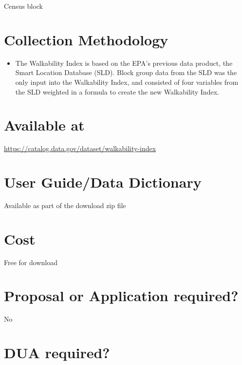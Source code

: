 \documentclass[
]{book}
\providecommand{\tightlist}{%
  \setlength{\itemsep}{0pt}\setlength{\parskip}{0pt}}
\begin{document}
Census block

\hypertarget{collection-methodology-97}{%
\section{Collection Methodology}\label{collection-methodology-97}}

\begin{itemize}
\tightlist
\item
  The Walkability Index is based on the EPA's previous data product, the Smart Location Database (SLD). Block group data from the SLD was the only input into the Walkability Index, and consisted of four variables from the SLD weighted in a formula to create the new Walkability Index.
\end{itemize}

\hypertarget{available-at-97}{%
\section{Available at}\label{available-at-97}}

\url{https://catalog.data.gov/dataset/walkability-index}

\hypertarget{user-guidedata-dictionary-97}{%
\section{User Guide/Data Dictionary}\label{user-guidedata-dictionary-97}}

Available as part of the download zip file

\hypertarget{cost-97}{%
\section{Cost}\label{cost-97}}

Free for download

\hypertarget{proposal-or-application-required-97}{%
\section{Proposal or Application required?}\label{proposal-or-application-required-97}}

No

\hypertarget{dua-required-97}{%
\section{DUA required?}\label{dua-required-97}}
\end{document}
